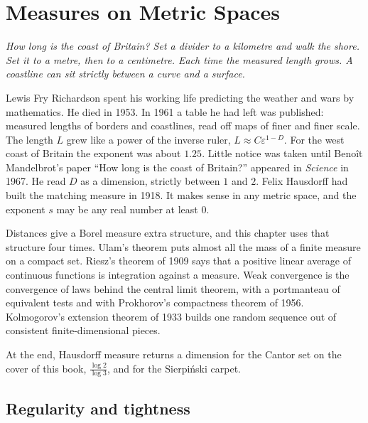 \chapter{Measures on Metric Spaces}\label{ch:metricmeasures}

\begin{center}\itshape
How long is the coast of Britain? Set a divider to a kilometre and walk the shore. Set it to a metre, then to a centimetre.
Each time the measured length grows. A coastline can sit strictly between a curve and a surface.
\end{center}

Lewis Fry Richardson spent his working life predicting the weather and wars by mathematics. He died in 1953. In 1961 a table he had
left was published: measured lengths of borders and coastlines, read off maps of finer and finer scale. The length $L$ grew like a
power of the inverse ruler, $L\approx C\varepsilon^{1-D}$. For the west coast of Britain the exponent was about $1.25$. Little notice was
taken until Beno\^it Mandelbrot's paper ``How long is the coast of Britain?'' appeared in \emph{Science} in 1967. He read $D$ as a
dimension, strictly between $1$ and $2$. Felix Hausdorff had built the matching measure in 1918. It makes sense in any metric space, and
the exponent $s$ may be any real number at least $0$.

Distances give a Borel measure extra structure, and this chapter uses that structure four times. Ulam's theorem puts almost all the mass
of a finite measure on a compact set. Riesz's theorem of 1909 says that a positive linear average of continuous functions is integration
against a measure. Weak convergence is the convergence of laws behind the central limit theorem, with a portmanteau of equivalent tests and
with Prokhorov's compactness theorem of 1956. Kolmogorov's extension theorem of 1933 builds one random sequence out of consistent
finite-dimensional pieces.


At the end, Hausdorff measure returns a dimension for the Cantor set on the cover of this book, $\frac{\log 2}{\log 3}$, and for the
Sierpi\'nski carpet.

\section{Regularity and tightness}

